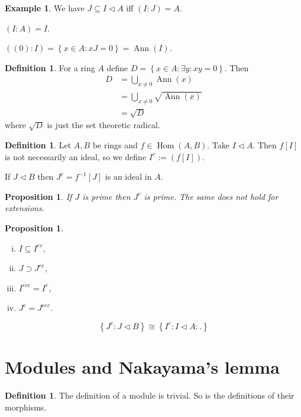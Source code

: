 \documentclass{article}
\DeclareMathOperator{\Hom}{Hom}
\newcommand{\setwith}[2]{\left\{#1:#2\right\}}
\DeclareMathOperator{\Ann}{Ann}
\newcommand{\ideal}{\triangleleft}
\newtheorem{proposition}[theorem]{Proposition}
\theoremstyle{definition}
\newtheorem{definition}[theorem]{Definition}
\newtheorem{example}[theorem]{Example}
\begin{document}
\begin{example}
    We have \(J\subseteq I\ideal A\) iff \((I:J)=A\).

    \((I:A)=I\).

    \(((0):I)=\setwith{x\in A}{xJ=0}=\Ann(I)\).
\end{example}

\begin{definition}
    For a ring \(A\) define \(D=\setwith{x\in A}{\exists y:xy=0}\).
    Then
    \begin{align*}
        D & =\bigcup_{x\neq0}\Ann(x)        \\
          & =\bigcup_{x\neq0}\sqrt{\Ann(x)} \\
          & =\sqrt{D}
    \end{align*}
    where \(\sqrt{D}\) is just the set theoretic radical.
\end{definition}

\begin{definition}
    Let \(A,B\) be rings and \(f\in\Hom(A,B)\). Take \(I\ideal A\).
    Then \(f[I]\) is not necessarily an ideal, so we define \(I^{e}:=(f[I])\).

    If \(J\ideal B\) then \(J^{c}=f^{-1}[J]\) is an ideal in \(A\).
\end{definition}

\begin{proposition}
    If \(J\) is prime then \(J^{c}\) is prime. The same does not hold for
    extensions.
\end{proposition}

\begin{proposition}
    \begin{enumerate}[i.]
        \item \(I\subseteq I^{ec}\),
        \item \(J\supset J^{ce}\),
        \item \(I^{ece}=I^{e}\),
        \item \(J^{c}=J^{cec}\).
    \end{enumerate}

    \[
        \setwith{J^{c}}{J\ideal B}\cong \setwith{I^{c}:I\ideal A}.
    \]
\end{proposition}

\section{Modules and Nakayama's lemma}
\begin{definition}
    The definition of a module is trivial. So is the definitions of their
    morphisms.
\end{definition}
\end{document}
